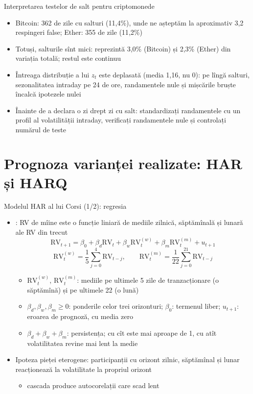 \begin{frame}{Interpretarea testelor de salt pentru criptomonede}
\itemsize{\small}
\begin{itemize}
    \item Bitcoin: 362 de zile cu salturi (11{,}4\%), unde ne așteptăm la aproximativ 3{,}2 respingeri false; Ether: 355 de zile (11{,}2\%)
    \item Totuși, salturile sînt mici: reprezintă 3{,}0\% (Bitcoin) și 2{,}3\% (Ether) din variația totală; restul este continuu
    \item Întreaga distribuție a lui $z_t$ este deplasată (media 1{,}16, nu 0): pe lîngă salturi, sezonalitatea intraday pe 24 de ore, randamentele nule și mișcările bruște încalcă ipotezele nulei
    \item Înainte de a declara o zi drept zi cu salt: standardizați randamentele cu un profil al volatilității intraday, verificați randamentele nule și controlați numărul de teste
\end{itemize}
\end{frame}


\section{Prognoza varianței realizate: HAR și HARQ}

\begin{frame}{Modelul HAR al lui Corsi (1/2): regresia}
\itemsize{\small}
\begin{itemize}
    \item {}: RV de mîine este o funcție liniară de mediile zilnică, săptămînală și lunară ale RV din trecut
    \[ \mathrm{RV}_{t+1} = \beta_0 + \beta_d\mathrm{RV}_t + \beta_w\mathrm{RV}^{(w)}_t + \beta_m\mathrm{RV}^{(m)}_t + u_{t+1} \]
    \[ \mathrm{RV}^{(w)}_t = \frac15\sum_{j=0}^4\mathrm{RV}_{t-j}, \qquad \mathrm{RV}^{(m)}_t = \frac1{22}\sum_{j=0}^{21}\mathrm{RV}_{t-j} \]
    \begin{itemize}
        \item $\mathrm{RV}^{(w)}_t$, $\mathrm{RV}^{(m)}_t$: mediile pe ultimele 5 zile de tranzacționare (o săptămînă) și pe ultimele 22 (o lună)
        \item $\beta_d, \beta_w, \beta_m \ge 0$: ponderile celor trei orizonturi; $\beta_0$: termenul liber; $u_{t+1}$: eroarea de prognoză, cu media zero
        \item $\beta_d + \beta_w + \beta_m$: persistența; cu cît este mai aproape de 1, cu atît volatilitatea revine mai lent la medie
    \end{itemize}
    \item Ipoteza pieței eterogene: participanții cu orizont zilnic, săptămînal și lunar reacționează la volatilitate la propriul orizont
    \begin{itemize}
        \item cascada produce autocorelații care scad lent
    \end{itemize}
\end{itemize}
\end{frame}

